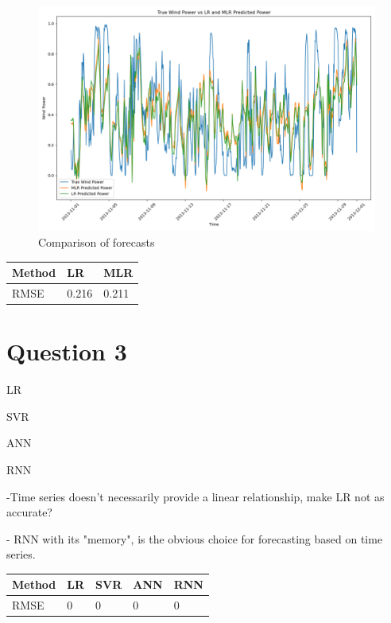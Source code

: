 \documentclass[a4paper, article, oneside, USenglish, IN5460]{memoir}
\begin{document}
\begin{figure}[H]
    \centering
    \includegraphics[width=1\linewidth]{fig/q2-forecast.png}
    \caption{Comparison of forecasts }
    \label{fig:q2-forecast}
\end{figure}


\begin{table}[H]
\begin{tabular}{|l|l|l|}
\hline
Method & LR & MLR  \\ \hline
RMSE   & 0.216  & 0.211    \\ \hline
\end{tabular}
\end{table}


\chapter{Question 3}

LR

SVR

ANN

RNN

-Time series doesn't necessarily provide a linear relationship, make LR not as accurate?

- RNN with its "memory", is the obvious choice for forecasting based on time series.

\begin{table}[H]
\begin{tabular}{|l|l|l|l|l|}
\hline
Method & LR & SVR & ANN & RNN \\ \hline
RMSE   & 0  & 0   & 0   & 0   \\ \hline
\end{tabular}
\end{table}
\end{document}
